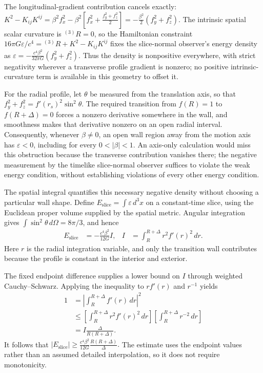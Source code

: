 \documentclass[11pt]{article}
\begin{document}
The longitudinal-gradient contribution cancels exactly:
$K^2-K_{ij}K^{ij}=\beta^2f_x^2-\beta^2\left[f_x^2+\frac{f_y^2+f_z^2}{2}\right]=-\frac{\beta^2}{2}(f_y^2+f_z^2).$
The intrinsic spatial scalar curvature is ${}^{(3)}R=0$, so the Hamiltonian constraint $16\pi G\varepsilon/c^4={}^{(3)}R+K^2-K_{ij}K^{ij}$ fixes the slice-normal observer's energy density as
$\varepsilon=-\frac{c^4\beta^2}{32\pi G}(f_y^2+f_z^2).$
Thus the density is nonpositive everywhere, with strict negativity wherever a transverse profile gradient is nonzero; no positive intrinsic-curvature term is available in this geometry to offset it.

For the radial profile, let $\theta$ be measured from the translation axis, so that $f_y^2+f_z^2=f'(r_s)^2\sin^2\theta$. The required transition from $f(R)=1$ to $f(R+\Delta)=0$ forces a nonzero derivative somewhere in the wall, and smoothness makes that derivative nonzero on an open radial interval. Consequently, whenever $\beta\neq0$, an open wall region away from the motion axis has $\varepsilon<0$, including for every $0<|\beta|<1$. An axis-only calculation would miss this obstruction because the transverse contribution vanishes there; the negative measurement by the timelike slice-normal observer suffices to violate the weak energy condition, without establishing violations of every other energy condition.

The spatial integral quantifies this necessary negative density without choosing a particular wall shape. Define $E_{\mathrm{slice}}=\int\varepsilon\,d^3x$ on a constant-time slice, using the Euclidean proper volume supplied by the spatial metric. Angular integration gives $\int\sin^2\theta\,d\Omega=8\pi/3$, and hence
\begin{align*}
E_{\mathrm{slice}} &= -\frac{c^4\beta^2}{12G}I, &
I &= \int_R^{R+\Delta}r^2 f'(r)^2\,dr.
\end{align*}
Here $r$ is the radial integration variable, and only the transition wall contributes because the profile is constant in the interior and exterior.

The fixed endpoint difference supplies a lower bound on $I$ through weighted Cauchy–Schwarz. Applying the inequality to $rf'(r)$ and $r^{-1}$ yields
\begin{align*}
1 &= \left|\int_R^{R+\Delta}f'(r)\,dr\right|^2\\
  &\leq \left[\int_R^{R+\Delta}r^2f'(r)^2\,dr\right]
     \left[\int_R^{R+\Delta}r^{-2}\,dr\right]\\
  &= I\frac{\Delta}{R(R+\Delta)}.
\end{align*}
It follows that
$|E_{\mathrm{slice}}|\geq\frac{c^4\beta^2}{12G}\frac{R(R+\Delta)}{\Delta}.$
The estimate uses the endpoint values rather than an assumed detailed interpolation, so it does not require monotonicity.
\end{document}
